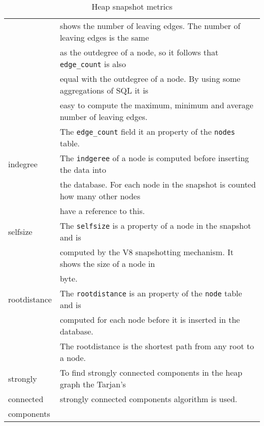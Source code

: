 \begin{table}[!htbp]
\begin{tabular}{|l||l|}
						& shows the number of leaving edges. 
						  The number of leaving edges is the same 	\\
						& as the outdegree of a node, so it follows 
						  that \texttt{edge\_count} is also 		\\
						& equal with the outdegree of a node. By 
						  using some aggregations of SQL it is 		\\
						& easy to compute the maximum, minimum and 
						  average number of leaving edges. 			\\
						& The \texttt{edge\_count} field it an 
						  property of the \texttt{nodes} table.		\\ \hline
		indegree		& The \texttt{indgeree} of a node is 
						  computed before inserting the data into	\\
						& the database. For each node in the 
						  snapshot is counted how many other nodes	\\
						& have a reference to this.					\\ \hline
		selfsize		& The \texttt{selfsize} is a property of a 
						  node in the snapshot and is 				\\
						& computed by the V8 snapshotting mechanism. 
						   It shows the size of a node in			\\
						& byte.										\\ \hline 
		rootdistance	& The \texttt{rootdistance} is an property 
						  of the \texttt{node} table and is 		\\
						& computed for each node before it is 
						  inserted in the database. 				\\
						& The rootdistance is the shortest path from 
						   any root to a node.						\\ \hline
		strongly		& To find strongly connected components in 
						  the heap graph the Tarjan's 				\\ 
		connected		& strongly connected components
			 			  algorithm\cite{Trajan} is used.			\\
		components		&											\\ \hline
	\end{tabular}
	\caption{Heap snapshot metrics}
	\label{tap:heap_snapshot_metrics}
\end{table}
		
